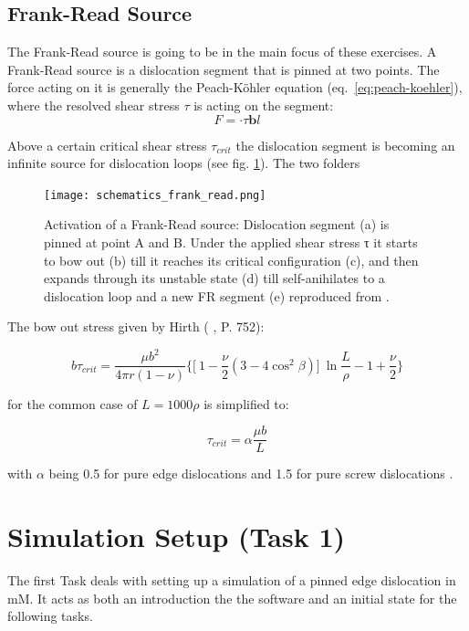 \FloatBarrier
\subsection{Frank-Read Source}

The Frank-Read source is going to be in the main focus of these exercises. A Frank-Read source is a dislocation segment that is pinned at two points. The force acting on it is generally the Peach-Köhler equation (eq.~\ref{eq:peach-koehler}), where the resolved shear stress \(\tau\) is acting on the segment:
\begin{equation}
	F =  \cdot \tau \mathbf{b}l
\end{equation} 

Above a certain critical shear stress \(\tau_{crit}\) the dislocation segment is becoming an infinite source for dislocation loops (see fig. \ref{fig:frank-read-scheme}). The two folders 

\begin{figure}[htb]
	\centering
	\texttt{[image: schematics\_frank\_read.png]}
	\caption{ Activation of a Frank-Read source: Dislocation segment (a) is pinned at point A
		and B. Under the applied shear stress τ it starts to bow out (b) till it reaches
		its critical configuration (c), and then expands through its unstable state (d) till
		self-anihilates to a dislocation loop and a new FR segment (e) reproduced from \cite{zaiser}.}
	\label{fig:frank-read-scheme}
\end{figure}

The bow out stress given by Hirth ( \cite{anderson2017}, P. 752):

\begin{equation}
	b\tau_{crit} = \frac{\mu b^{2}}{4\pi r(1-\nu)} \biggl\{ \biggl[\ 1- \frac{\nu}{2}(3-4\cos^{2}\beta) \biggr]\ \ln \frac{L}{\rho} -1 + \frac{\nu}{2} \biggr\} \label{eq:tau_crit}
\end{equation}

for the common case of \( L =1000\rho \) is simplified to: 

\begin{equation}
	\tau_{crit} = \alpha \frac{\mu b}{L} \label{eq:tau_crit}
\end{equation}

with \(\alpha\) being 0.5 for pure edge dislocations and 1.5 for pure screw dislocations \cite{zaiser}. 

\section{Simulation Setup (Task 1)}
The first Task deals with setting up a simulation of a pinned edge dislocation in mM. It acts as both an introduction the the software and an initial state for the following tasks.

